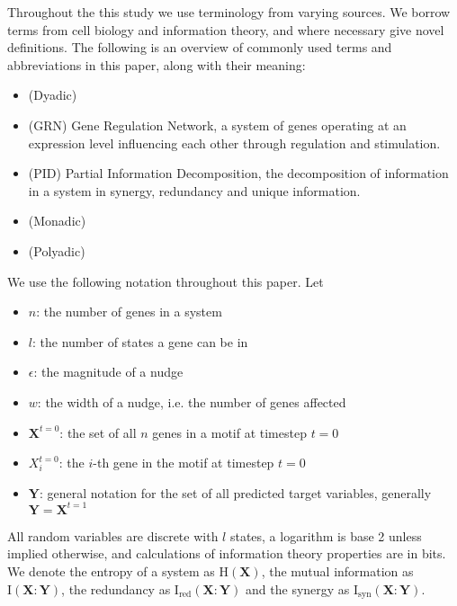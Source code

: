 \documentclass[../main.tex]{subfiles}
\begin{document}
Throughout the this study we use terminology from varying sources.
We borrow terms from cell biology and information theory, and where necessary give novel definitions.
The following is an overview of commonly used terms and abbreviations in this paper, along with their meaning:

\begin{itemize}
\item (Dyadic)
\item (GRN) Gene Regulation Network, a system of genes operating at an expression level influencing each other through regulation and stimulation.
\item (PID) Partial Information Decomposition, the decomposition of information in a system in synergy, redundancy and unique information.
\item (Monadic)
\item (Polyadic)
\end{itemize}

We use the following notation throughout this paper. Let
\begin{itemize}
\item[] $n$: the number of genes in a system
\item[] $l$: the number of states a gene can be in
\item[] $\epsilon$: the magnitude of a nudge
\item[] $w$: the width of a nudge, i.e. the number of genes affected
\item[] $\mathbf{X}^{t=0}$: the set of all $n$ genes in a motif at timestep $t=0$
\item[] $X_i^{t=0}$: the $i$-th gene in the motif at timestep $t=0$
\item[] $\mathbf{Y}$: general notation for the set of all predicted target variables, generally $\mathbf{Y} = \mathbf{X}^{t=1}$
\end{itemize}
All random variables are discrete with $l$ states, a logarithm is base 2 unless implied otherwise, and calculations of information theory properties are in bits.
We denote the entropy of a system as $\mathrm{H}(\mathbf{X})$, the mutual information as $\mathrm{I}(\mathbf{X}:\mathbf{Y})$, the redundancy as $\mathrm{I}_\mathrm{red}(\mathbf{X}:\mathbf{Y})$ and the synergy as $\mathrm{I}_\mathrm{syn}(\mathbf{X}:\mathbf{Y})$.
\end{document}
